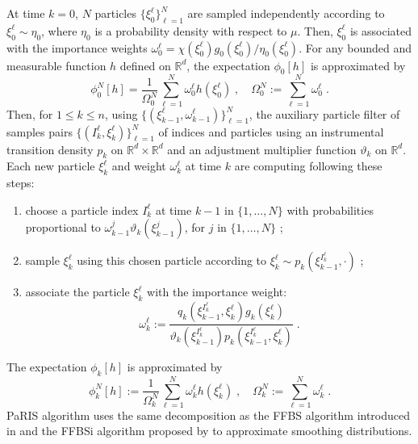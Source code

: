 \documentclass[12pt]{article}
\newcommand{\eqsp}{\;}
\newcommand{\1}{\mathrm{1}}
\newcommand{\qk}{q_{k}}
\begin{document}
At time $k = 0$, $N$ particles $\{\xi^{\ell}_0\}_{\ell=1}^N$ are sampled independently according to  $\xi^{\ell}_0 \sim \eta_0$, where $\eta_0$ is a probability density with respect to $\mu$. 
Then, $\xi^{\ell}_0$ is associated with the importance weights $\omega_0^{\ell} = \chi(\xi^{\ell}_0)g_0 (\xi^{\ell}_0)/\eta_0(\xi^{\ell}_0)$. 
For any bounded and measurable function $h$ defined on $\mathbb{R}^d$, the expectation $\phi_{0}[h] $ is approximated by
\[
\phi^N_{0}[h] = \frac{1}{\Omega_0^N} \sum_{\ell=1}^N \omega_0^{\ell} h \left(\xi^{\ell}_0 \right)\eqsp, \quad \Omega_0^N:= \sum_{\ell=1}^N \omega_0^{\ell}\eqsp.
\]
Then, for $1\le k \le n$, using $\{(\xi^{\ell}_{k-1},\omega^{\ell}_{k-1})\}_{\ell=1}^N$, the auxiliary particle filter of \cite{pitt:shephard:1999} samples pairs $\{(I^{\ell}_k,\xi^{\ell}_{k})\}_{\ell=1}^N$ of indices and particles using an instrumental transition density $p_k$ on $\mathbb{R}^d\times \mathbb{R}^d$ and an adjustment multiplier function $\vartheta_k$ on $\mathbb{R}^d$. Each new particle $\xi^{\ell}_{k}$ and weight $\omega^{\ell}_k$ at time $k$ are computing following these steps:
\begin{enumerate}[-]
\item choose a particle index $I^{\ell}_k$ at time $k-1$ in $\{1,\ldots,N\}$ with probabilities proportional to $\omega_{k-1}^{j} \vartheta_k (\xi^{j}_{k-1})$, for $j$ in $\{1,\ldots,N\}$ ;
\item sample  $\xi^{\ell}_{k}$ using this chosen particle according to $\xi^{\ell}_{k} \sim p_k(\xi^{I^{\ell}_k}_{k-1},\cdot)$ ; 
\item  associate the particle $\xi^{\ell}_k$ with the importance weight:
\begin{equation}
\label{eq:importance:weights}
\omega^{\ell}_k := \frac{\qk(\xi_{k-1}^{I^{\ell}_k},\xi^{\ell}_k)g_k(\xi^{\ell}_k)}{\vartheta_k(\xi^{I^{\ell}_k}_{k-1}) p_k (\xi_{k-1}^{I^{\ell}_k},\xi^{\ell}_k)}\eqsp.
\end{equation}
\end{enumerate} 
The expectation $\phi_{k}[h]$ is approximated by
\[
\phi^N_{k}[h] := \frac{1}{\Omega_k^N} \sum_{\ell=1}^N \omega_k^{\ell} h \left(\xi^{\ell}_k \right)\eqsp,\quad\Omega_k^N:= \sum_{\ell=1}^N \omega_k^{\ell}\eqsp.
\]
PaRIS algorithm uses the same decomposition as the FFBS algorithm introduced in \cite{doucetgodsillandrieu:2000} and the FFBSi algorithm proposed by \cite{godsill:doucet:west:2004} to approximate smoothing distributions. 
\end{document}
